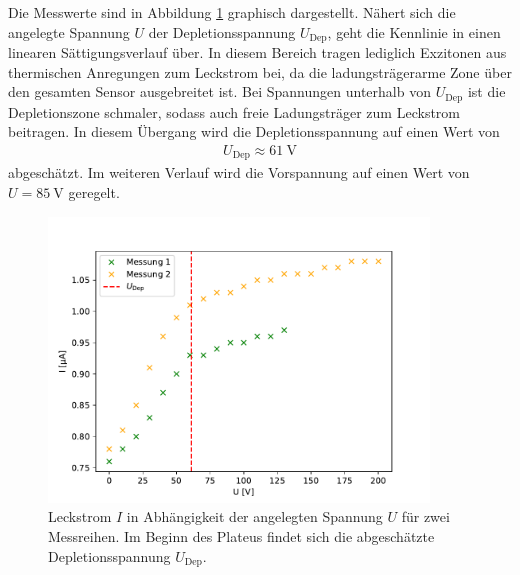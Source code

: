   Die Messwerte sind in Abbildung \ref{fig:UI-Kennlinie} graphisch dargestellt.
  Nähert sich die angelegte Spannung $U$ der Depletionsspannung $U_{\mathrm{Dep}}$, geht die Kennlinie in einen linearen Sättigungsverlauf über.
  In diesem Bereich tragen lediglich Exzitonen aus thermischen Anregungen zum Leckstrom bei, da die ladungsträgerarme Zone über den gesamten Sensor ausgebreitet ist. Bei Spannungen unterhalb von $U_{\mathrm{Dep}}$ ist die Depletionszone schmaler, sodass auch freie Ladungsträger zum Leckstrom beitragen.
  In diesem Übergang wird die Depletionsspannung auf einen Wert von
  \begin{align*}
    U_{\mathrm{Dep}} \approx \SI{61}{\volt}
  \end{align*}
  abgeschätzt. Im weiteren Verlauf wird die Vorspannung auf einen Wert von $U=\SI{85}{\volt}$ geregelt.

\begin{figure}
  \centering
  \includegraphics[width=0.9\textwidth]{plots/Kennlinie.pdf}
  \caption{Leckstrom $I$ in Abhängigkeit der angelegten Spannung $U$ für zwei Messreihen. Im Beginn des Plateus findet sich die abgeschätzte Depletionsspannung $U_{\mathrm{Dep}}$.}
  \label{fig:UI-Kennlinie}
\end{figure}
\FloatBarrier

